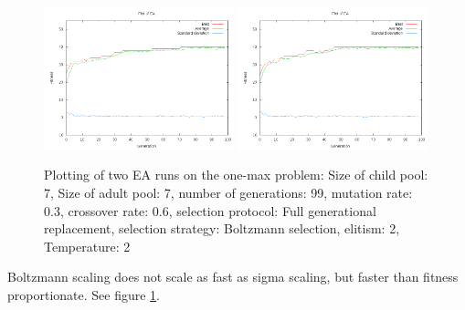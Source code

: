 \documentclass[11pt]{article}
\begin{document}
\begin{figure}[ht]
\begin{center}
\mbox{\includegraphics[width=0.49\textwidth]{images/bol1.png}}
\mbox{\includegraphics[width=0.49\textwidth]{images/bol2.png}}
\end{center}
\caption{Plotting of two EA runs on the one-max problem:
Size of child pool: 7,
Size of adult pool: 7,
number of generations: 99,
mutation rate: 0.3,
crossover rate: 0.6,
selection protocol: Full generational replacement,
selection strategy: Boltzmann selection,
elitism: 2,
Temperature: 2}
\label{fig:7}
\end{figure}

Boltzmann scaling does not scale as fast as sigma scaling, but faster than
fitness proportionate. See figure \ref{fig:7}.
\end{document}
